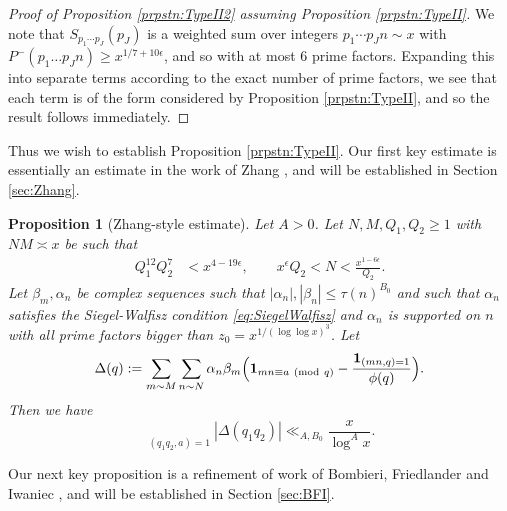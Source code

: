 \documentclass[10pt]{amsart}
\theoremstyle{plain}
\newtheorem{prpstn}[thrm]{Proposition}
\numberwithin{equation}{section}
\newcommand{\Mod}[1]{\ (\mathrm{mod}\ #1)}
\begin{document}
%
%
%
%
%
%
%
%
\begin{proof}[Proof of Proposition \ref{prpstn:TypeII2} assuming Proposition \ref{prpstn:TypeII}]
We note that $S_{p_1\cdots p_J}(p_J)$ is a weighted sum over integers $p_1\cdots p_J n\sim x$ with $P^-(p_1\dots p_J n)\ge x^{1/7+10\epsilon}$, and so with at most 6 prime factors. Expanding this into separate terms according to the exact number of prime factors, we see that each term is of the form considered by Proposition \ref{prpstn:TypeII}, and so the result follows immediately. 
\end{proof}
%
%
%
%
%
%
%
%
Thus we wish to establish Proposition \ref{prpstn:TypeII}. Our first key estimate is essentially an estimate in the work of Zhang \cite{Zhang}, and will be established in Section \ref{sec:Zhang}.
%
%
%
%
%
%
%
%
\begin{prpstn}[Zhang-style estimate]\label{prpstn:Zhang}
Let $A>0$. Let $N,M,Q_1,Q_2\ge 1$ with $NM\asymp x$ be such that
\begin{align*}
Q_1^{12}Q_2^{7}&<x^{4-19\epsilon},\qquad
x^\epsilon Q_2<N<\frac{x^{1-6\epsilon}}{Q_2}.
\end{align*}
Let $\beta_m,\alpha_n$ be complex sequences such that $|\alpha_n|,|\beta_n|\le \tau(n)^{B_0}$ and such that $\alpha_{n}$ satisfies the Siegel-Walfisz condition \eqref{eq:SiegelWalfisz} and $\alpha_n$ is supported on $n$ with all prime factors bigger than $z_0=x^{1/(\log\log{x})^3}$. Let
\[
\Delta(q):=\sum_{m\sim M}\sum_{\substack{n\sim N}}\alpha_n\beta_m\Bigl(\mathbf{1}_{m n\equiv a \Mod{q}}-\frac{\mathbf{1}_{(m n,q)=1}}{\phi(q)}\Bigr).
\]
Then we have
\[
\mathop{\sum_{q_1\sim Q_1}\sum_{q_2\sim Q_2}}\limits_{(q_1q_2,a)=1}|\Delta(q_1q_2)|\ll_{A,B_0} \frac{x}{\log^A{x}}.
\]
\end{prpstn}
%
%
%
%
%
%
%
%
Our next key proposition is a refinement of work of Bombieri, Friedlander and Iwaniec \cite[Theorem 4]{BFI2}, and will be established in Section \ref{sec:BFI}.
%
%
%
%
%
%
%
%
\end{document}
